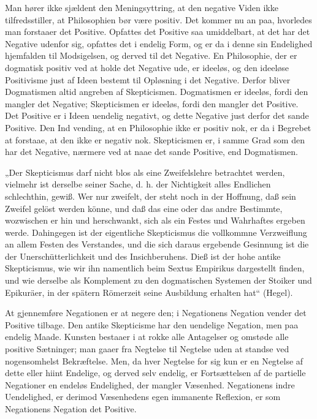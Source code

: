 \documentclass[12pt]{book}
\newcommand{\opage}[1]{\marginnote{\footnotesize\textit{[#1]}}}
\begin{document}
Man hører ikke sjældent den Meningsyttring, at den negative Viden ikke tilfredsstiller, at
Philosophien bør være positiv. Det kommer nu an paa, hvorledes man forstaaer det Positive.
Opfattes det Positive saa umiddelbart, at det har det Negative udenfor sig, opfattes det i endelig
Form, og er da i denne sin Endelighed hjemfalden til Modsigelsen, og derved til det Negative. En
Philosophie, der er dogmatisk positiv ved at holde det Negative ude, er ideeløs, og den ideeløse
Positivisme just af Ideen bestemt til Opløsning i det Negative. Derfor bliver Dogmatismen altid
angreben af Skepticismen. Dogmatismen er ideeløs, fordi den mangler
det Negative; Skepticismen er ideeløs, fordi den mangler det Positive. Det Positive er i Ideen
uendelig negativt, og dette Negative just derfor det sande Positive. Den Ind%
\opage{153}vending, at en Philosophie ikke er positiv nok, er da i Begrebet at forstaae, at den ikke er
negativ nok. Skepticismen er, i samme Grad som den har det Negative, nærmere ved at naae det sande
Positive, end Dogmatismen.

„Der Skepticismus darf nicht blos als eine Zweifelslehre betrachtet werden, vielmehr ist derselbe
seiner Sache, d. h. der Nichtigkeit alles Endlichen schlechthin, gewiß. Wer nur zweifelt, der
steht noch in der Hoffnung, daß sein Zweifel gelöst werden könne, und daß das eine oder das andre
Bestimmte, wozwischen er hin und herschwankt, sich als ein Festes und Wahrhaftes ergeben werde.
Dahingegen ist der eigentliche Skepticismus die vollkommne Verzweiflung an allem Festen des
Verstandes, und die sich daraus ergebende Gesinnung ist die der Unerschütterlichkeit und des
Insichberuhens. Dieß ist der hohe antike Skepticismus, wie wir ihn namentlich beim Sextus
Empirikus dargestellt finden, und wie derselbe als Komplement zu den dogmatischen Systemen der
Stoiker und Epikuräer, in der spätern Römerzeit seine Ausbildung erhalten hat“ (Hegel).

At gjennemføre Negationen er at negere den; i Negationens Negation vender det Positive tilbage. Den
antike Skepticisme har den uendelige Negation, men paa endelig Maade. Kunsten bestaaer i at rokke
alle Antagelser og omstøde alle positive Sætninger; man gaaer fra Negtelse til Negtelse uden at
standse ved nogensomhelst Bekræftelse. Men, da hver Negtelse for sig kun er en Negtelse af dette
eller hiint Endelige, og derved selv endelig, er Fortsættelsen af de partielle Negationer en
endeløs Endelighed, der mangler Væsenhed. Negationens indre Uendelighed, er derimod Væsenhedens
egen immanente Reflexion, er som Negationens Negation det Positive.
\end{document}
